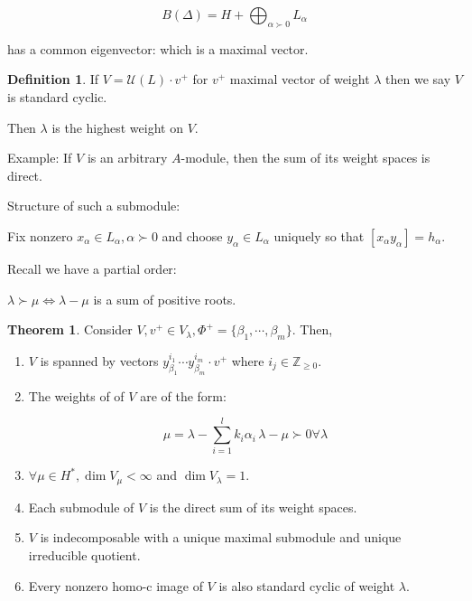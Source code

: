 \documentclass{article}
\theoremstyle{definition}
\newtheorem*{definition}{Definition}
\newtheorem{theorem}{Theorem}
\begin{document}
    \[
        B(\Delta) = H + \bigoplus_{\alpha \succ 0} L_\alpha 
    \]

    has a common eigenvector: which is a maximal vector.

    \begin{definition}
        If \(V = \mathcal{U}(L) \cdot v^+\) for \(v^+\) maximal vector of weight \(\lambda\) then we say \(V\) is standard cyclic.

        Then \(\lambda\) is the highest weight on \(V\).
    \end{definition}

    Example: If \(V\) is an arbitrary \(A\)-module, then the sum of its weight spaces is direct.
    
    Structure of such a submodule:

    Fix nonzero \(x_\alpha \in L_\alpha, \alpha \succ 0\) and choose \(y_\alpha \in L_\alpha\) uniquely so that \([x_\alpha y_\alpha] = h_\alpha\).
    
    Recall we have a partial order:

    \(\lambda \succ \mu \iff \lambda - \mu\) is a sum of positive roots.

    \begin{theorem}
        Consider \(V, v^+\in V_\lambda, \Phi^+ = \{ \beta_1, \cdots , \beta_m \}\). Then,

        \begin{enumerate}[label=\alph*)]
            \item \(V\) is spanned by vectors \(y_{\beta_1}^{i_1} \cdots y_{\beta_m}^{i_m} \cdot v^+\) where \(i_j \in \mathbb{Z}_{\geq 0}\).
            \item The weights of of \(V\) are of the form:
            
            \[
                \mu = \lambda - \sum_{i=1}^l k_i \alpha_i \, \lambda - \mu \succ 0 \forall \lambda
            \]

            \item \(\forall \mu \in H^{\ast}, \dim V_\mu < \infty\) and \(\dim V_\lambda = 1\).
            
            \item Each submodule of \(V\) is the direct sum of its weight spaces.
            \item \(V\) is indecomposable with a unique maximal submodule and unique irreducible quotient.
            \item Every nonzero homo-c image of \(V\) is also standard cyclic of weight \(\lambda\).
        \end{enumerate} 
    \end{theorem}
\end{document}
